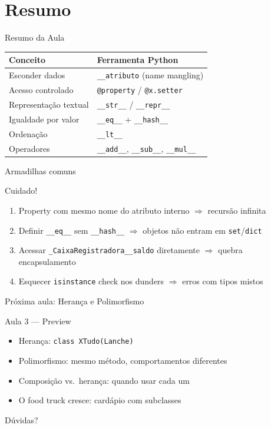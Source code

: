 \documentclass[aspectratio=169]{beamer}
\begin{document}
\section{Resumo}

\begin{frame}{Resumo da Aula}
\begin{center}
\begin{tabular}{ll}
\toprule
\textbf{Conceito} & \textbf{Ferramenta Python} \\
\midrule
Esconder dados        & \texttt{\_\_atributo} (name mangling) \\
Acesso controlado     & \texttt{@property} / \texttt{@x.setter} \\
Representação textual & \texttt{\_\_str\_\_} / \texttt{\_\_repr\_\_} \\
Igualdade por valor   & \texttt{\_\_eq\_\_} + \texttt{\_\_hash\_\_} \\
Ordenação             & \texttt{\_\_lt\_\_} \\
Operadores            & \texttt{\_\_add\_\_}, \texttt{\_\_sub\_\_}, \texttt{\_\_mul\_\_} \\
\bottomrule
\end{tabular}
\end{center}
\end{frame}

\begin{frame}{Armadilhas comuns}
\begin{alertblock}{Cuidado!}
\begin{enumerate}
    \item Property com mesmo nome do atributo interno $\Rightarrow$ recursão infinita
    \item Definir \texttt{\_\_eq\_\_} sem \texttt{\_\_hash\_\_} $\Rightarrow$ objetos não entram em \texttt{set}/\texttt{dict}
    \item Acessar \texttt{\_CaixaRegistradora\_\_saldo} diretamente $\Rightarrow$ quebra encapsulamento
    \item Esquecer \texttt{isinstance} check nos dunders $\Rightarrow$ erros com tipos mistos
\end{enumerate}
\end{alertblock}
\end{frame}

\begin{frame}{Próxima aula: Herança e Polimorfismo}
\begin{block}{Aula 3 --- Preview}
\begin{itemize}
    \item Herança: \texttt{class XTudo(Lanche)}
    \item Polimorfismo: mesmo método, comportamentos diferentes
    \item Composição vs.\ herança: quando usar cada um
    \item O food truck cresce: cardápio com subclasses
\end{itemize}
\end{block}

\bigskip
\centering
\Large Dúvidas?
\end{frame}
\end{document}
